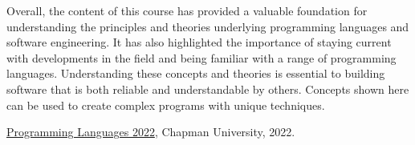 \documentclass{article}
\theoremstyle{theorem}
\theoremstyle{definition}
\theoremstyle{remark}
\begin{document}
\medskip
Overall, the content of this course has provided a valuable foundation for understanding the principles and theories underlying programming languages and software engineering. It has also highlighted the importance of staying current with developments in the field and being familiar with a range of programming languages. Understanding these concepts and theories is essential to building software that is both reliable and understandable by others. Concepts shown here can be used to create complex programs with unique techniques.

\begin{thebibliography}{99}
 \href{https://github.com/alexhkurz/programming-languages-2022/blob/main/README.md}{Programming Languages 2022}, Chapman University, 2022.
\end{thebibliography}
\end{document}
